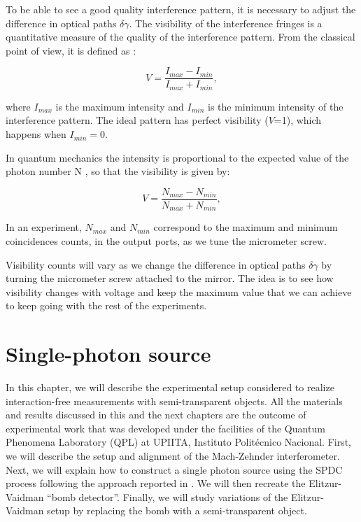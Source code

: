 \documentclass[12pt]{book}
\begin{document}
To be able to see a good quality interference pattern, it is necessary to adjust the difference in optical paths $\delta \gamma$. The visibility of the interference fringes is a quantitative measure of the quality of the interference pattern. From the classical point of view, it is defined as \cite{hecht}:

\begin{equation}
V=\frac{I_{max}-I_{min}}{I_{max}+I_{min}},
\end{equation}

where $I_{max}$ is the maximum intensity and $I_{min}$ is the minimum intensity of the interference pattern. The ideal pattern has perfect visibility ($V$=1), which happens when $I_{min}=0$.

In quantum mechanics the intensity is proportional to the expected value of the photon number N \cite {glauber}, so that the visibility is given by:

\begin{equation}
V=\frac{N_{max}-N_{min}}{N_{max}+N_{min}},
\end{equation}

In an experiment, $N_{max}$ and $N_{min}$ correspond to the maximum and minimum coincidences counts, in the output ports, as we tune the micrometer screw.

Visibility counts will vary as we change the difference in optical paths $\delta\gamma$ by turning the micrometer screw attached to the mirror. The idea is to see how visibility changes with voltage and keep the maximum value that we can achieve to keep going with the rest of the experiments.

\section{Single-photon source}


In this chapter, we will describe the experimental setup considered to realize interaction-free measurements with semi-transparent objects. All the materials and results discussed in this and the next chapters are the outcome of experimental work that was developed under the facilities of the Quantum Phenomena Laboratory (QPL) at UPIITA, Instituto Politécnico Nacional. First, we will describe the setup and alignment of the Mach-Zehnder interferometer. Next, we will explain how to construct a single photon source using the SPDC process following the approach reported in \cite{maestria_procopio}. We will then recreate the Elitzur-Vaidman ``bomb detector''. Finally, we will study variations of the Elitzur-Vaidman setup by replacing the bomb with a semi-transparent object. 
\end{document}
